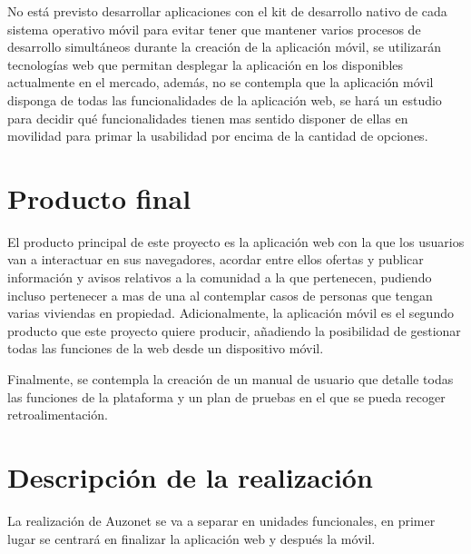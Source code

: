 \documentclass{DeustoFDP}
\begin{document}
No está previsto desarrollar aplicaciones con el kit de desarrollo nativo de cada sistema operativo móvil para evitar tener que mantener varios procesos de desarrollo simultáneos durante la creación de la aplicación móvil, se utilizarán tecnologías web que permitan desplegar la aplicación en los disponibles actualmente en el mercado, además, no se contempla que la aplicación móvil disponga de todas las funcionalidades de la aplicación web, se hará un estudio para decidir qué funcionalidades tienen mas sentido disponer de ellas en movilidad para primar la usabilidad por encima de la cantidad de opciones.

\chapter{Producto final}
El producto principal de este proyecto es la aplicación web con la que los usuarios van a interactuar en sus navegadores, acordar entre ellos ofertas y publicar información y avisos relativos a la comunidad a la que pertenecen, pudiendo incluso pertenecer a mas de una al contemplar casos de personas que tengan varias viviendas en propiedad. Adicionalmente, la aplicación móvil es el segundo producto que este proyecto quiere producir, añadiendo la posibilidad de gestionar todas las funciones de la web desde un dispositivo móvil.

Finalmente, se contempla la creación de un manual de usuario que detalle todas las funciones de la plataforma y un plan de pruebas en el que se pueda recoger retroalimentación.

\chapter{Descripción de la realización}
La realización de Auzonet se va a separar en unidades funcionales, en primer lugar se centrará en finalizar la aplicación web y después la móvil.
\end{document}
